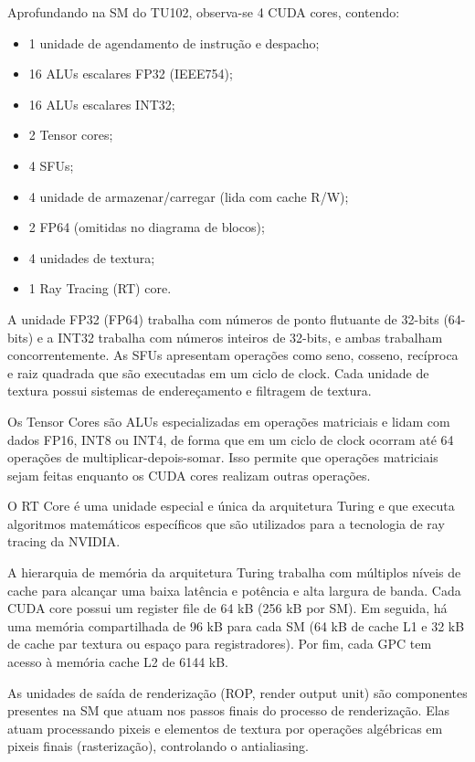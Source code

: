 \documentclass[letterpaper, 10 pt, conference]{ieeeconf}  %
\begin{document}
Aprofundando na SM do TU102, observa-se 4 CUDA cores, contendo:

\begin{itemize}
    \item 1 unidade de agendamento de instrução e despacho;
    \item 16 ALUs escalares FP32 (IEEE754);
    \item 16 ALUs escalares INT32;
    \item 2 Tensor cores;
    \item 4 SFUs;
    \item 4 unidade de armazenar/carregar (lida com cache R/W);
    \item 2 FP64 (omitidas no diagrama de blocos);
    \item 4 unidades de textura;
    \item 1 Ray Tracing (RT) core.
\end{itemize}

A unidade FP32 (FP64) trabalha com números de ponto flutuante de 32-bits (64-bits) e a INT32 trabalha com números inteiros de 32-bits, e ambas trabalham concorrentemente. As SFUs apresentam operações como seno, cosseno, recíproca e raiz quadrada que são executadas em um ciclo de clock. Cada unidade de textura possui sistemas de endereçamento e filtragem de textura. 

Os Tensor Cores são ALUs especializadas em operações matriciais e lidam com dados FP16, INT8 ou INT4, de forma que em um ciclo de clock ocorram até 64 operações de multiplicar-depois-somar. Isso permite que operações matriciais sejam feitas enquanto os CUDA cores realizam outras operações. 

O RT Core é uma unidade especial e única da arquitetura Turing e que executa algoritmos matemáticos específicos que são utilizados para a tecnologia de ray tracing da NVIDIA.

A hierarquia de memória da arquitetura Turing trabalha com múltiplos níveis de cache para alcançar uma baixa latência e potência e alta largura de banda. Cada CUDA core possui um register file de 64 kB (256 kB por SM). Em seguida, há uma memória compartilhada de 96 kB para cada SM (64 kB de cache L1 e 32 kB de cache par textura ou espaço para registradores). Por fim, cada GPC tem acesso à memória cache L2 de 6144 kB.

As unidades de saída de renderização (ROP, render output unit) são componentes presentes na SM que atuam nos passos finais do processo de renderização. Elas atuam processando pixeis e elementos de textura por operações algébricas em pixeis finais (rasterização), controlando o antialiasing.
\end{document}
